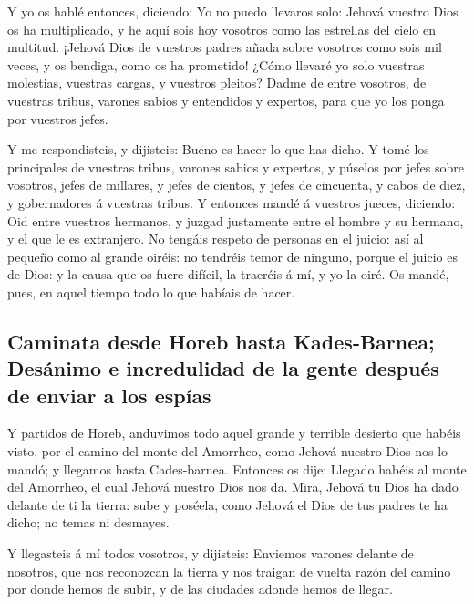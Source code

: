  Y yo os hablé entonces, diciendo: Yo no puedo llevaros
solo:  Jehová vuestro Dios os ha multiplicado, y he aquí
sois hoy vosotros como las estrellas del cielo en multitud.
 ¡Jehová Dios de vuestros padres añada sobre vosotros como
sois mil veces, y os bendiga, como os ha prometido!  ¿Cómo
llevaré yo solo vuestras molestias, vuestras cargas, y vuestros pleitos?
 Dadme de entre vosotros, de vuestras tribus, varones
sabios y entendidos y expertos, para que yo los ponga por vuestros
jefes.

 Y me respondisteis, y dijisteis: Bueno es hacer lo que has
dicho.  Y tomé los principales de vuestras tribus, varones
sabios y expertos, y púselos por jefes sobre vosotros, jefes de
millares, y jefes de cientos, y jefes de cincuenta, y cabos de diez, y
gobernadores á vuestras tribus.  Y entonces mandé á
vuestros jueces, diciendo: Oid entre vuestros hermanos, y juzgad
justamente entre el hombre y su hermano, y el que le es extranjero.
 No tengáis respeto de personas en el juicio: así al
pequeño como al grande oiréis: no tendréis temor de ninguno, porque el
juicio es de Dios: y la causa que os fuere difícil, la traeréis á mí, y
yo la oiré.  Os mandé, pues, en aquel tiempo todo lo que
habíais de hacer.

\hypertarget{caminata-desde-horeb-hasta-kades-barnea-desuxe1nimo-e-incredulidad-de-la-gente-despuuxe9s-de-enviar-a-los-espuxedas}{%
\subsection{Caminata desde Horeb hasta Kades-Barnea; Desánimo e
incredulidad de la gente después de enviar a los
espías}\label{caminata-desde-horeb-hasta-kades-barnea-desuxe1nimo-e-incredulidad-de-la-gente-despuuxe9s-de-enviar-a-los-espuxedas}}

 Y partidos de Horeb, anduvimos todo aquel grande y
terrible desierto que habéis visto, por el camino del monte del
Amorrheo, como Jehová nuestro Dios nos lo mandó; y llegamos hasta
Cades-barnea.  Entonces os dije: Llegado habéis al monte
del Amorrheo, el cual Jehová nuestro Dios nos da.  Mira,
Jehová tu Dios ha dado delante de ti la tierra: sube y poséela, como
Jehová el Dios de tus padres te ha dicho; no temas ni desmayes.

 Y llegasteis á mí todos vosotros, y dijisteis: Enviemos
varones delante de nosotros, que nos reconozcan la tierra y nos traigan
de vuelta razón del camino por donde hemos de subir, y de las ciudades
adonde hemos de llegar.

